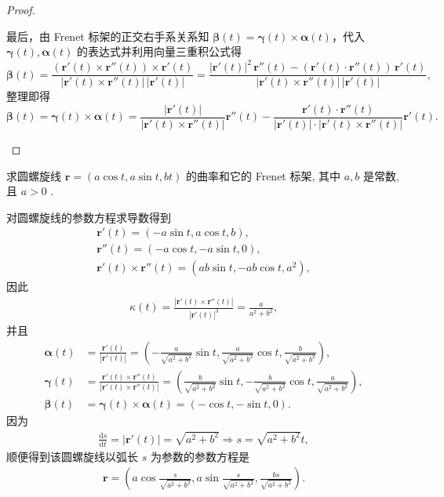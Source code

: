 \documentclass[../../main.tex]{subfiles}%
\begin{document}
\begin{proof}
\begin{enumerate}
\[\]
最后，由 Frenet 标架的正交右手系关系知 $\bm{\beta}(t)=\bm{\gamma}(t)\times\bm{\alpha}(t)$，代入 $\bm{\gamma}(t),\bm{\alpha}(t)$ 的表达式并利用向量三重积公式得
\[
\boldsymbol{\beta }\left( t \right) =\frac{(\boldsymbol{r}'\left( t \right) \times \boldsymbol{r}'' \left( t \right) )\times \boldsymbol{r}'\left( t \right)}{|\boldsymbol{r}'\left( t \right) \times \boldsymbol{r}'' \left( t \right) |\,|\boldsymbol{r}'\left( t \right) |}=\frac{|\boldsymbol{r}'\left( t \right) |^2\,\boldsymbol{r}'' \left( t \right) -(\boldsymbol{r}'\left( t \right) \cdot \boldsymbol{r}'' \left( t \right) )\,\boldsymbol{r}'\left( t \right)}{|\boldsymbol{r}'\left( t \right) \times \boldsymbol{r}'' \left( t \right) |\,|\boldsymbol{r}'\left( t \right) |},
\]
整理即得
\[
\bm{\beta}(t) = \bm{\gamma}(t) \times \bm{\alpha}(t) = \frac{|\bm{r}'(t)|}{|\bm{r}'(t) \times \bm{r}''(t)|}\bm{r}''(t) - \frac{\bm{r}'(t) \cdot \bm{r}''(t)}{|\bm{r}'(t)| \cdot |\bm{r}'(t) \times \bm{r}''(t)|}\bm{r}'(t).
\]
\end{enumerate}
\end{proof}

\begin{example}\label{example:微分几何-例题2.1}
求圆螺旋线 $\bm{r} = (a\cos t, a\sin t, bt)$ 的曲率和它的 Frenet 标架, 其中 $a,b$ 是常数, 且 $a>0$ .
\end{example}
\begin{solution}
对圆螺旋线的参数方程求导数得到
\begin{gather*}
\bm{r}'(t) = (-a\sin t, a\cos t, b), \\
\bm{r}''(t) = (-a\cos t, -a\sin t, 0), \\
\bm{r}'(t) \times \bm{r}''(t) = (ab\sin t, -ab\cos t, a^2),
\end{gather*}
因此
\begin{align*}
\kappa(t) = \frac{|\bm{r}'(t) \times \bm{r}''(t)|}{|\bm{r}'(t)|^3} = \frac{a}{a^2 + b^2},
\end{align*}
并且
\begin{align*}
\bm{\alpha}(t) &= \frac{\bm{r}'(t)}{|\bm{r}'(t)|} = \left(-\frac{a}{\sqrt{a^2 + b^2}}\sin t, \frac{a}{\sqrt{a^2 + b^2}}\cos t, \frac{b}{\sqrt{a^2 + b^2}}\right), \\
\bm{\gamma}(t) &= \frac{\bm{r}'(t) \times \bm{r}''(t)}{|\bm{r}'(t) \times \bm{r}''(t)|} = \left(\frac{b}{\sqrt{a^2 + b^2}}\sin t, -\frac{b}{\sqrt{a^2 + b^2}}\cos t, \frac{a}{\sqrt{a^2 + b^2}}\right), \\
\bm{\beta}(t) &= \bm{\gamma}(t) \times \bm{\alpha}(t) = (-\cos t, -\sin t, 0).
\end{align*}
因为
\begin{align*}
\frac{\mathrm{d}s}{\mathrm{d}t} = |\bm{r}'(t)| = \sqrt{a^2 + b^2}\Longrightarrow s = \sqrt{a^2 + b^2}t,
\end{align*}
顺便得到该圆螺旋线以弧长 $s$ 为参数的参数方程是
\begin{align*}
\bm{r} = \left(a\cos\frac{s}{\sqrt{a^2 + b^2}}, a\sin\frac{s}{\sqrt{a^2 + b^2}}, \frac{bs}{\sqrt{a^2 + b^2}}\right).
\end{align*}

\end{solution}
\end{document}
